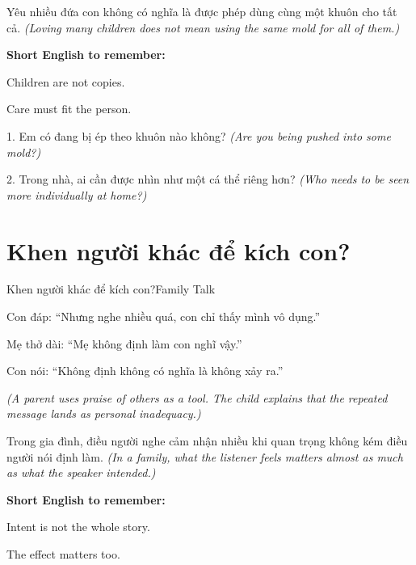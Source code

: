 \begin{baihoc}
Yêu nhiều đứa con không có nghĩa là được phép dùng cùng một khuôn cho tất cả.
\textit{(Loving many children does not mean using the same mold for all of them.)}
\end{baihoc}

\begin{ghinhoanh}
\textbf{Short English to remember:}

Children are not copies.

Care must fit the person.
\end{ghinhoanh}

\begin{tuhocnhanh}
1. Em có đang bị ép theo khuôn nào không? \textit{(Are you being pushed into some mold?)}

2. Trong nhà, ai cần được nhìn như một cá thể riêng hơn? \textit{(Who needs to be seen more individually at home?)}
\end{tuhocnhanh}
\ngancach

\section{Khen người khác để kích con?}
\begin{truyen}{Khen người khác để kích con?}{Family Talk}

Con đáp: ``Nhưng nghe nhiều quá, con chỉ thấy mình vô dụng.''

Mẹ thở dài: ``Mẹ không định làm con nghĩ vậy.''

Con nói: ``Không định không có nghĩa là không xảy ra.''

\textit{(A parent uses praise of others as a tool. The child explains that the repeated message lands as personal inadequacy.)}
\end{truyen}

\begin{baihoc}
Trong gia đình, điều người nghe cảm nhận nhiều khi quan trọng không kém điều người nói định làm.
\textit{(In a family, what the listener feels matters almost as much as what the speaker intended.)}
\end{baihoc}

\begin{ghinhoanh}
\textbf{Short English to remember:}

Intent is not the whole story.

The effect matters too.
\end{ghinhoanh}

